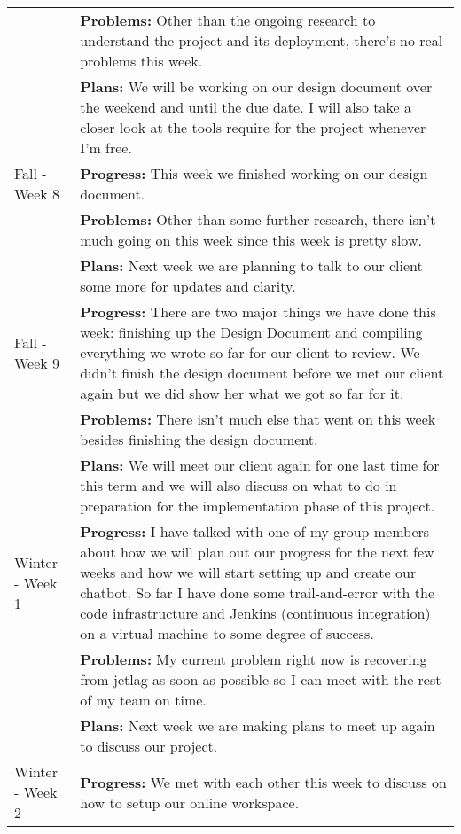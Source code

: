 \begin{longtable}[ht]{| p{1.5cm} | p{13.5cm} |}
     \\ & \textbf{Problems:}
     Other than the ongoing research to understand the project and its deployment, there's no real problems this week.
     \\ & \textbf{Plans:}
     We will be working on our design document over the weekend and until the due date. 
     I will also take a closer look at the tools require for the project whenever I'm free.
     \\
     \hline
     Fall - Week 8 &
     \textbf{Progress:} This week we finished working on our design document. 
     \\ & \textbf{Problems:}
     Other than some further research, there isn't much going on this week since this week is pretty slow.
     \\ & \textbf{Plans:}
     Next week we are planning to talk to our client some more for updates and clarity.
     \\
     \hline
     Fall - Week 9 &
     \textbf{Progress:}
     There are two major things we have done this week: finishing up the Design Document and compiling everything we wrote so far for our client to review. We didn't finish the design document before we met our client again but we did show her what we got so far for it.
     \\ & \textbf{Problems:}
     There isn't much else that went on this week besides finishing the design document.
     \\ & \textbf{Plans:}
     We will meet our client again for one last time for this term and we will also discuss on what to do in preparation for the implementation phase of this project.
     \\
     \hline
     Winter - Week 1 &
     \textbf{Progress:}
     I have talked with one of my group members about how we will plan out our progress for the next few weeks and how we will start setting up and create our chatbot. 
     So far I have done some trail-and-error with the code infrastructure and Jenkins (continuous integration) on a virtual machine to some degree of success. 
     \\ & \textbf{Problems:}
     My current problem right now is recovering from jetlag as soon as possible so I can meet with the rest of my team on time.
     \\ & \textbf{Plans:}
     Next week we are making plans to meet up again to discuss our project.
     \\
     \hline
     Winter - Week 2 &
     \textbf{Progress:}
     We met with each other this week to discuss on how to setup our online workspace.

\end{longtable}
